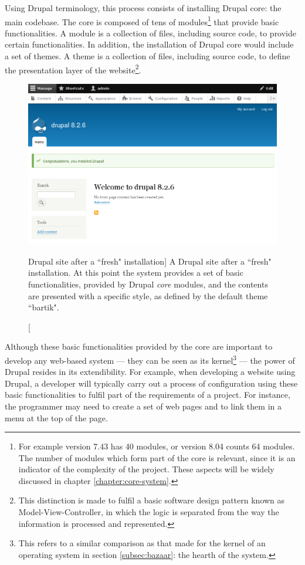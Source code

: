 Using Drupal terminology, this process consists of installing Drupal core: the main codebase. The core is composed of tens of modules\footnote{For example version 7.43 has 40 modules, or version 8.04 counts 64 modules. The number of modules which form part of the core is relevant, since it is an indicator of the complexity of the project. These aspects will be widely discussed in chapter \ref{chapter:core-system}.} that provide basic functionalities. A module is a collection of files, including source code, to provide certain functionalities. In addition, the installation of Drupal core would include a set of themes. A theme is a collection of files, including source code, to define the presentation layer of the website\footnote{This distinction is made to fulfil a basic software design pattern known as Model-View-Controller, in which the logic is separated from the way the information is processed and represented.}.

\begin{figure}[H]
	\centering
	\includegraphics[scale=0.45]{img/fresh_drupal.png}
	\caption[Drupal site after a ``fresh" installation]%
    {A Drupal site after a ``fresh" installation. At this point the system provides a set of basic functionalities, provided by Drupal \textit{core} modules, and the contents are presented with a specific style, as defined by the default theme ``bartik".}
	\label{fresh-drupal}
\end{figure}

Although these basic functionalities provided by the core are  important to develop any web-based system --- they can be seen as its kernel\footnote{This refers to a similar comparison as that made for the kernel of an operating system in section \ref{subsec:bazaar}: the hearth of the system.} --- the power of Drupal resides in its extendibility. For example, when developing a website using Drupal, a developer will typically carry out a process of configuration using these basic functionalities to fulfil part of the requirements of a project. For instance, the programmer may need to create a set of web pages and to link them in a menu at the top of the page.

